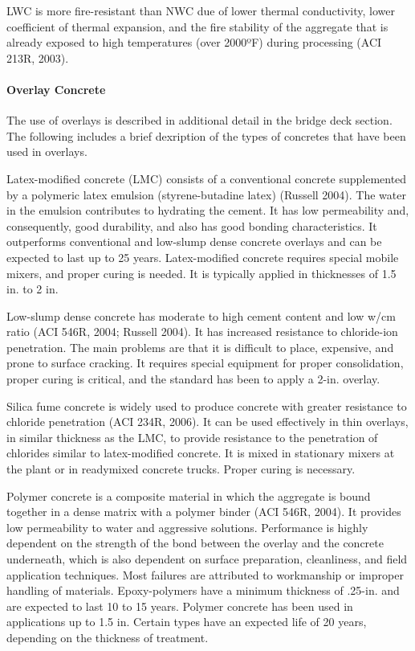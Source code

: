 LWC is more fire-resistant than NWC due of lower thermal conductivity, lower coefficient of thermal expansion,
and the fire stability of the aggregate that is already exposed to high temperatures (over 2000ºF) during processing
(ACI 213R, 2003).

\paragraph{Overlay Concrete}
The use of overlays is described in additional detail in the bridge deck section. The following includes a brief
dexription of the types of concretes that have been used in overlays.

Latex-modified concrete (LMC) consists of a conventional concrete supplemented by a polymeric latex
emulsion (styrene-butadine latex) (Russell 2004). The water in the emulsion contributes to hydrating the cement. It
has low permeability and, consequently, good durability, and also has good bonding characteristics. It outperforms
conventional and low-slump dense concrete overlays and can be expected to last up to 25 years. Latex-modified concrete requires special mobile mixers, and proper curing is needed. It is typically applied in thicknesses of 1.5 in.
to 2 in.

Low-slump dense concrete has moderate to high cement content and low w/cm ratio (ACI 546R, 2004; Russell
2004). It has increased resistance to chloride-ion penetration. The main problems are that it is difficult to place,
expensive, and prone to surface cracking. It requires special equipment for proper consolidation, proper curing is
critical, and the standard has been to apply a 2-in. overlay.

Silica fume concrete is widely used to produce concrete with greater resistance to chloride penetration (ACI
234R, 2006). It can be used effectively in thin overlays, in similar thickness as the LMC, to provide resistance to the
penetration of chlorides similar to latex-modified concrete. It is mixed in stationary mixers at the plant or in readymixed
concrete trucks. Proper curing is necessary.

Polymer concrete is a composite material in which the aggregate is bound together in a dense matrix with a
polymer binder (ACI 546R, 2004). It provides low permeability to water and aggressive solutions. Performance is
highly dependent on the strength of the bond between the overlay and the concrete underneath, which is also
dependent on surface preparation, cleanliness, and field application techniques. Most failures are attributed to
workmanship or improper handling of materials. Epoxy-polymers have a minimum thickness of .25-in. and are
expected to last 10 to 15 years. Polymer concrete has been used in applications up to 1.5 in. Certain types have an
expected life of 20 years, depending on the thickness of treatment.


